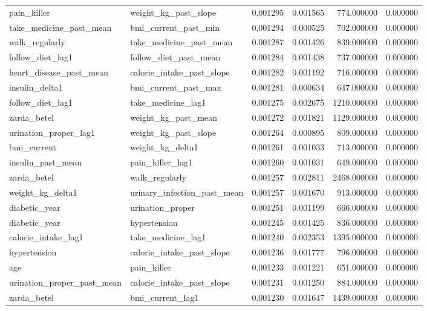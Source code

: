 \begin{longtable}{llrrrr}
pain\_killer & weight\_kg\_past\_slope & 0.001295 & 0.001565 & 774.000000 & 0.000000 \\
take\_medicine\_past\_mean & bmi\_current\_past\_min & 0.001294 & 0.000525 & 702.000000 & 0.000000 \\
walk\_regularly & take\_medicine\_past\_mean & 0.001287 & 0.001426 & 839.000000 & 0.000000 \\
follow\_diet\_lag1 & follow\_diet\_past\_mean & 0.001284 & 0.001438 & 737.000000 & 0.000000 \\
heart\_disease\_past\_mean & calorie\_intake\_past\_slope & 0.001282 & 0.001192 & 716.000000 & 0.000000 \\
insulin\_delta1 & bmi\_current\_past\_max & 0.001281 & 0.000634 & 647.000000 & 0.000000 \\
follow\_diet\_lag1 & take\_medicine\_lag1 & 0.001275 & 0.002675 & 1210.000000 & 0.000000 \\
zarda\_betel & weight\_kg\_past\_mean & 0.001272 & 0.001821 & 1129.000000 & 0.000000 \\
urination\_proper\_lag1 & weight\_kg\_past\_slope & 0.001264 & 0.000895 & 809.000000 & 0.000000 \\
bmi\_current & weight\_kg\_delta1 & 0.001261 & 0.001033 & 713.000000 & 0.000000 \\
insulin\_past\_mean & pain\_killer\_lag1 & 0.001260 & 0.001031 & 649.000000 & 0.000000 \\
zarda\_betel & walk\_regularly & 0.001257 & 0.002811 & 2468.000000 & 0.000000 \\
weight\_kg\_delta1 & urinary\_infection\_past\_mean & 0.001257 & 0.001670 & 913.000000 & 0.000000 \\
diabetic\_year & urination\_proper & 0.001251 & 0.001199 & 666.000000 & 0.000000 \\
diabetic\_year & hypertension & 0.001245 & 0.001425 & 836.000000 & 0.000000 \\
calorie\_intake\_lag1 & take\_medicine\_lag1 & 0.001240 & 0.002353 & 1395.000000 & 0.000000 \\
hypertension & calorie\_intake\_past\_slope & 0.001236 & 0.001777 & 796.000000 & 0.000000 \\
age & pain\_killer & 0.001233 & 0.001221 & 651.000000 & 0.000000 \\
urination\_proper\_past\_mean & calorie\_intake\_past\_slope & 0.001231 & 0.001250 & 884.000000 & 0.000000 \\
zarda\_betel & bmi\_current\_lag1 & 0.001230 & 0.001647 & 1439.000000 & 0.000000 \\

\end{longtable}
